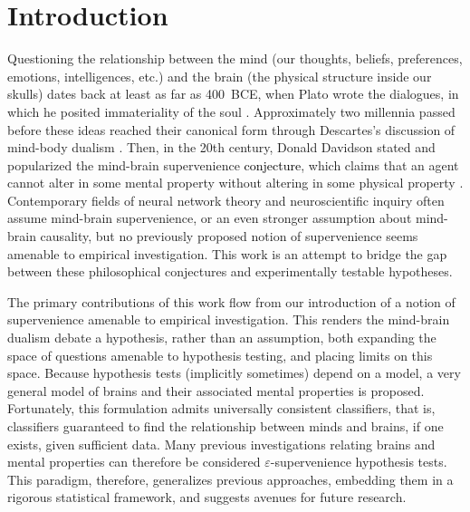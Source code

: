 \documentclass{article}
\newcommand{\eps}{\varepsilon}
\providecommand{\tr}[1]{\textcolor{black}{#1}}
\begin{document}
\section{Introduction}

Questioning the relationship between the mind (our thoughts, beliefs, preferences, emotions, intelligences, etc.) and the brain (the physical structure inside our skulls) dates back at least as far as 400~BCE, when Plato wrote the dialogues, in which he posited immateriality of the soul \cite{Plato97}. Approximately two millennia passed before these ideas reached their canonical form through Descartes's discussion of mind-body dualism \cite{Descartes1641}. Then, in the 20th century, Donald Davidson stated and popularized the mind-brain supervenience \tr{conjecture}, which claims that an agent cannot alter in some mental property without altering in some physical property \cite{Davidson70}. Contemporary fields of neural network theory and neuroscientific inquiry often assume mind-brain supervenience, or an even stronger assumption about mind-brain causality, but no previously proposed notion of supervenience seems amenable to empirical investigation. This work is an attempt to bridge the gap between these philosophical conjectures and experimentally testable hypotheses. %

The primary contributions of this work flow from our introduction of a notion of supervenience amenable to empirical investigation.  This renders the mind-brain dualism debate a hypothesis, rather than an assumption, both expanding the space of questions amenable to hypothesis testing, and placing limits on this space.  Because hypothesis tests (implicitly sometimes) depend on a model, a very general model of brains and their associated mental properties is proposed.  Fortunately, this formulation admits universally consistent classifiers, that is, classifiers guaranteed to find the relationship between minds and brains, if one exists, given sufficient data.  Many previous investigations relating brains and mental properties can therefore be considered $\eps$-supervenience hypothesis tests.  This paradigm, therefore, generalizes previous approaches, embedding them in a rigorous statistical framework, and suggests avenues for future research.


\end{document}
